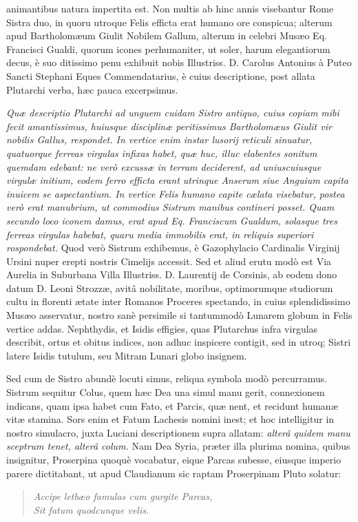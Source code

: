 \documentclass[a4paper, 11pt, oneside, polutonikogreek, latin]{article}
\begin{document}
animantibus natura impertita est. Non multis ab hinc annis visebantur Rome Sistra duo, in quoru utroque Felis efficta erat humano ore conspicua; alterum apud Bartholomæum Giulit Nobilem Gallum, alterum in celebri Musæo Eq. Francisci Gualdi, quorum icones perhumaniter, ut soler, harum elegantiorum decus, è suo ditissimo penu exhibuit nobis Illustriss. D. Carolus Antonius à Puteo Sancti Stephani Eques Commendatarius, è cuius descriptione, post allata Plutarchi verba, hæc pauca excerpsimus.

\emph{Quæ descriptio Plutarchi ad unguem cuidam Sistro antiquo, cuius copiam mibi fecit amantissimus, huiusque disciplinæ peritissimus Bartholomæus Giulit vir nobilis Gallus, respondet. In vertice enim instar lusorij reticuli sinuatur, quatuorque ferreas virgulas infixas habet, quæ huc, illuc elabentes sonitum quemdam edebant: ne verò excussæ in terram deciderent, ad uniuscuiusque virgulæ initium, eodem ferro efficta erant utrinque Anserum siue Anguium capita inuicem se aspectantium. In vertice Felis humano capite cælata visebatur, postea verò erat manubrium, ut commodius Sistrum manibus contineri posset. Quam secundo loco iconem damus, erat apud Eq. Franciscum Gualdum, solasque tres ferreas virgulas habebat, quaru media immobilis erat, in reliquis superiori rospondebat.} Quod verò Sistrum exhibemus, è Gazophylacio Cardinalis Virginij Ursini nuper erepti nostris Cimelijs accessit. Sed et aliud erutu modò est Via Aurelia in Suburbana Villa Illustriss. D. Laurentij de Corsinis, ab eodem dono datum D. Leoni Strozzæ, avitâ nobilitate, moribus, optimorumque studiorum cultu in florenti ætate inter Romanos Proceres spectando, in cuius splendidissimo Musæo asservatur, nostro sanè persimile si tantummodò Lunarem globum in Felis vertice addas. Nephthydis, et Isidis effigies, quas Plutarchus infra virgulas describit, ortus et obitus indices, non adhuc inspicere contigit, sed in utroq; Sistri latere Isidis tutulum, seu Mitram Lunari globo insignem.

Sed cum de Sistro abundè locuti simus, reliqua symbola modò percurramus. Sistrum sequitur Colus, quem hæc Dea una simul manu gerit, connexionem indicans, quam ipsa habet cum Fato, et Parcis, quæ nent, et recidunt humanæ vitæ stamina. Sors enim et Fatum Lachesis nomini inest; et hoc intelligitur in nostro simulacro, juxta Luciani descriptionem supra allatam: \emph{alterâ quidem manu sceptrum tenet, alterâ colum.} Nam Dea Syria, præter illa plurima nomina, quibus insignitur, Proserpina quoquè vocabatur, eique Parcas subesse, eiusque imperio parere dictitabant, ut apud Claudianum sic raptam Proserpinam Pluto solatur:
\begin{quote}
\emph{Accipe letbæo famulas cum gurgite Parcas,}\\
\emph{Sit fatum quodcunque velis.}\\
\end{quote}
\end{document}
